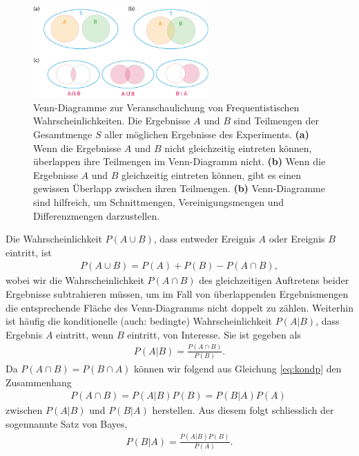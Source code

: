 \begin{figure}[H]
\centering
\includegraphics[width=0.6\textwidth]{Figures/venndiagramm.png}
\caption{Venn-Diagramme zur Veranschaulichung von Frequentistischen Wahrscheinlichkeiten. Die Ergebnisse $A$ und $B$ sind Teilmengen der Gesamtmenge $S$ aller möglichen Ergebnisse des Experiments. \textbf{(a)} Wenn die Ergebnisse $A$ und $B$ nicht gleichzeitig eintreten können, überlappen ihre Teilmengen im Venn-Diagramm nicht. \textbf{(b)} Wenn die Ergebnisse $A$ und $B$ gleichzeitig eintreten können, gibt es einen gewissen Überlapp zwischen ihren Teilmengen. \textbf{(b)} Venn-Diagramme sind hilfreich, um Schnittmengen, Vereinigungsmengen und Differenzmengen darzustellen.  }
\label{fig:venn}
\end{figure}

 Die Wahrscheinlichkeit $P(A \cup B)$, dass entweder Ereignis $A$ oder Ereignis $B$ eintritt, ist
\begin{align}
P(A \cup B) = P(A) + P(B) - P(A\cap B),
\label{eq:kombp}
\end{align}
wobei wir die Wahrscheinlichkeit $P(A\cap B)$ des gleichzeitigen Auftretens beider Ergebnisse subtrahieren müssen, um im Fall von überlappenden Ergebnismengen die entsprechende Fläche des Venn-Diagramms nicht doppelt zu zählen. Weiterhin ist häufig die  konditionelle  (auch: bedingte) Wahrscheinlichkeit $P(A|B)$, dass Ergebnis $A$ eintritt, wenn $B$ eintritt, von Interesse. Sie ist gegeben als
\begin{align}
P ( A | B ) = \frac{P ( A \cap B )}{P ( B )}.
\label{eq:kondp}
\end{align}
  Da $P(A \cap B) = P(B \cap A)$ können wir folgend aus Gleichung \ref{eq:kondp} den  Zusammenhang
\begin{align}
P ( A \cap B ) = P ( A | B ) P ( B ) = P ( B | A ) P ( A )\
\label{eq:bayespre}
\end{align}
 zwischen $P(A|B)$ und $P(B|A)$ herstellen. Aus diesem folgt schliesslich der sogennannte Satz von Bayes,
\begin{align}
P ( B | A ) = \frac{P ( A | B) P ( B )}{P ( A )}. 
\label{eq:bayes}
\end{align}

